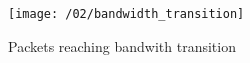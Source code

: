 

\begin{figure}[H]
\texttt{[image: /02/bandwidth\_transition]}
\caption{Packets reaching bandwith transition}
\label{fig:bandwidth_transition}
\end{figure}











